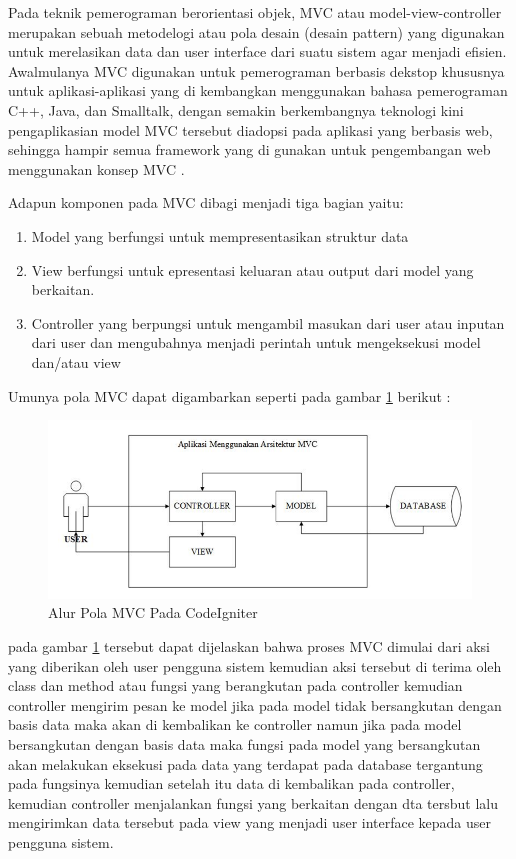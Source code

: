 Pada teknik pemerograman berorientasi objek, MVC atau model-view-controller merupakan sebuah metodelogi atau pola desain (desain pattern) yang digunakan untuk merelasikan data dan user interface dari suatu sistem agar menjadi efisien. Awalmulanya MVC digunakan untuk pemerograman berbasis dekstop khususnya untuk aplikasi-aplikasi yang di kembangkan menggunakan bahasa pemerograman C++, Java, dan Smalltalk, dengan semakin berkembangnya teknologi kini pengaplikasian model MVC tersebut diadopsi pada aplikasi yang berbasis web, sehingga hampir semua framework yang di gunakan untuk pengembangan web menggunakan konsep MVC \cite{raharjo2015belajar} .

Adapun komponen pada MVC dibagi menjadi tiga bagian yaitu:
\begin{enumerate}

\item Model yang berfungsi untuk mempresentasikan struktur data
\item View berfungsi untuk epresentasi keluaran atau output dari model yang berkaitan.
\item Controller  yang berpungsi untuk mengambil masukan dari user atau inputan dari user dan mengubahnya menjadi perintah untuk mengeksekusi model dan/atau view

\end{enumerate}

Umunya pola MVC dapat digambarkan seperti pada gambar \ref{C6} berikut :

\begin{figure}[!htbp]
	\centerline{\includegraphics[width=1\textwidth]{figures/ci/6.png}}
	\caption{Alur Pola MVC Pada CodeIgniter}
	\label{C6}
\end{figure}

	pada gambar \ref{C6} tersebut dapat dijelaskan bahwa proses MVC dimulai dari aksi yang diberikan oleh user pengguna sistem kemudian aksi tersebut di terima oleh class dan method atau fungsi yang berangkutan pada controller  kemudian controller mengirim pesan ke model jika pada model tidak bersangkutan dengan basis data maka akan di kembalikan ke controller namun jika pada model bersangkutan dengan basis data maka fungsi pada model yang bersangkutan akan melakukan eksekusi pada data yang terdapat pada database tergantung pada fungsinya kemudian setelah itu data di kembalikan pada controller, kemudian controller menjalankan fungsi yang berkaitan dengan dta tersbut lalu mengirimkan data tersebut pada view yang menjadi user interface kepada user pengguna sistem.
\pagebreak

